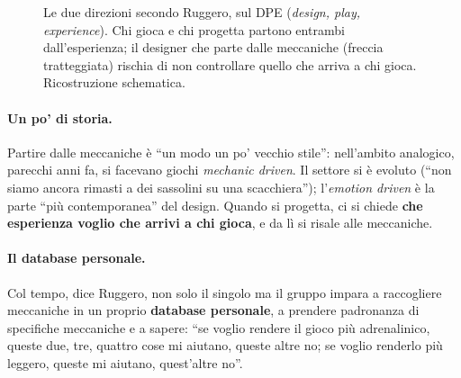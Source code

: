 \begin{figure}[htbp]
\centering
{}
\caption{Le due direzioni secondo Ruggero, sul DPE (\emph{design, play,
experience}). Chi gioca e chi progetta partono entrambi dall'esperienza; il
designer che parte dalle meccaniche (freccia tratteggiata) rischia di non
controllare quello che arriva a chi gioca. Ricostruzione schematica.}
\label{a7:fig:direzioni}
\end{figure}

\paragraph{Un po' di storia.} Partire dalle meccaniche è ``un modo un po' vecchio
stile'': nell'ambito analogico, parecchi anni fa, si facevano giochi
\emph{mechanic driven}. Il settore si è evoluto (``non siamo ancora rimasti a dei
sassolini su una scacchiera''); l'\emph{emotion driven} è la parte ``più
contemporanea'' del design. Quando si progetta, ci si chiede \textbf{che esperienza
voglio che arrivi a chi gioca}, e da lì si risale alle meccaniche.

\paragraph{Il database personale.} Col tempo, dice Ruggero, non solo il singolo ma il
gruppo impara a raccogliere meccaniche in un proprio \textbf{database personale}, a
prendere padronanza di specifiche meccaniche e a sapere: ``se voglio rendere il gioco
più adrenalinico, queste due, tre, quattro cose mi aiutano, queste altre no; se voglio
renderlo più leggero, queste mi aiutano, quest'altre no''.

